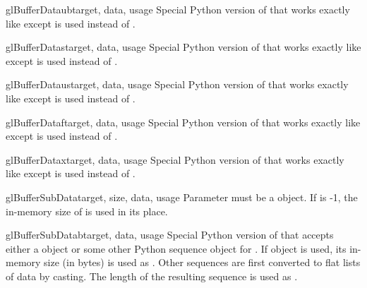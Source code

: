 \begin{funcdesc}{glBufferDataub}{target, data, usage}
Special Python version of  that works exactly like
 except  is used instead of
.
\end{funcdesc}

\begin{funcdesc}{glBufferDatas}{target, data, usage}
Special Python version of  that works exactly like
 except  is used instead of .
\end{funcdesc}

\begin{funcdesc}{glBufferDataus}{target, data, usage}
Special Python version of  that works exactly like
 except  is used instead of
.
\end{funcdesc}

\begin{funcdesc}{glBufferDataf}{target, data, usage}
Special Python version of  that works exactly like
 except  is used instead of .
\end{funcdesc}

\begin{funcdesc}{glBufferDatax}{target, data, usage}
Special Python version of  that works exactly like
 except  is used instead of .
\end{funcdesc}

\begin{funcdesc}{glBufferSubData}{target, size, data, usage}
Parameter  must be a  object. If  is -1,
the in-memory size of  is used in its place.
\end{funcdesc}

\begin{funcdesc}{glBufferSubDatab}{target, data, usage}
Special Python version of  that accepts either a
 object or some other Python sequence object for .
If  object is used, its in-memory size (in bytes) is used as
. Other sequences are first converted to flat lists of
 data by casting. The length of the resulting sequence is used as
.
\end{funcdesc}


